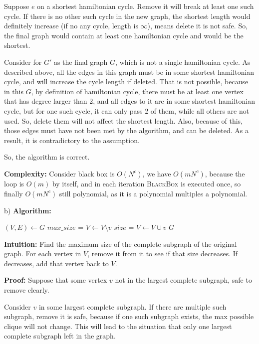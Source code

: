 \documentclass{article}
\newcommand{\Algorithm}{\textbf{Algorithm: }}
\newcommand{\Intuition}{\textbf{Intuition: }}
\newcommand{\Proof}{\textbf{Proof: }}
\newcommand{\Complexity}{\textbf{Complexity: }}
\begin{document}
\begin{enumerate}[topsep=0pt,parsep=1mm]
Suppose $e$ on a shortest hamiltonian cycle. Remove it will break at least one such cycle.
If there is no other such cycle in the new graph, the shortest length would definitely increase (if no any cycle, length is $\infty$),
means delete it is not safe. 
So, the final graph would contain at least one hamiltonian cycle and would be the shortest.

Consider for $G'$ as the final graph $G$, which is not a single hamiltonian cycle.
As described above, all the edges in this graph must be in some shortest hamiltonian cycle,
and will increase the cycle length if deleted.
That is not possible, because in this $G$, by definition of hamiltonian cycle,
there must be at least one vertex that has degree larger than 2,
and all edges to it are in some shortest hamiltonian cycle,
but for one such cycle, it can only pass 2 of them, while all others are not used.
So, delete them will not affect the shortest length.
Also, because of this, those edges must have not been met by the algorithm,
and can be deleted.
As a result, it is contradictory to the assumption.

So, the algorithm is correct.


\Complexity
Consider black box is $O(N^c)$, we have $O(mN^c)$, because the loop is $O(m)$ by itself,
and in each iteration \textsc{BlackBox} is executed once,
so finally $O(mN^c)$ still polynomial, as it is a polynomial multiples a polynomial.

b) \Algorithm

\begin{algorithm}[H]
  \DontPrintSemicolon
    

   {
    $(V,E)\gets G$\;
    $max\_size$ = \;
     {
      $V\gets V\setminus v$\;
      $size$ = \;
       {
        $V\gets V\cup v$
      }
    }
    \Return $G$
  }
\end{algorithm}

\Intuition
Find the maximum size of the complete subgraph of the original graph.
For each vertex in $V$, remove it from it to see if that size decreases.
If decreases, add that vertex back to $V$.

\Proof
Suppose that some vertex $v$ not in the largest complete subgraph,
safe to remove clearly.

Consider $v$ in some largest complete subgraph. 
If there are multiple such subgraph, remove it is safe,
because if one such subgraph exists, the max possible clique will not change.
This will lead to the situation that only one largest complete subgraph left in the graph.


\end{enumerate}
\end{document}

